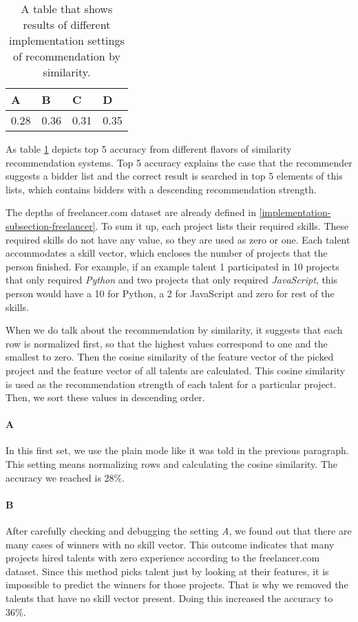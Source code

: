 \begin{table}[htp]
	\caption[Evaluation mid-results]{A table that shows results of different implementation settings of recommendation by similarity.}\label{tab:evaluation-rec-similarity}
	\centering
	\begin{tabular}{l l l l}
		\toprule
		A & B & C & D \\
		\midrule
		0.28 & 0.36 & 0.31 & 0.35 \\
		\bottomrule
	\end{tabular}
\end{table}

As table \ref{tab:evaluation-rec-similarity} depicts top 5 accuracy from different flavors of similarity recommendation systems. Top 5 accuracy explains the case that the recommender suggests a bidder list and the correct result is searched in top 5 elements of this lists, which contains bidders with a descending recommendation strength. 

The depths of freelancer.com dataset are already defined in \ref{implementation-subsection-freelancer}. To sum it up, each project lists their required skills. These required skills do not have any value, so they are used as zero or one. Each talent accommodates a skill vector, which encloses the number of projects that the person finished. For example, if an example talent 1 participated in 10 projects that only required \textit{Python} and two projects that only required \textit{JavaScript}, this person would have a 10 for Python, a 2 for JavaScript and zero for rest of the skills. 

When we do talk about the recommendation by similarity, it suggests that each row is normalized first, so that the highest values correspond to one and the smallest to zero. Then the cosine similarity of the feature vector of the picked project and the feature vector of all talents are calculated. This cosine similarity is used as the recommendation strength of each talent for a particular project. Then, we sort these values in descending order. 

\paragraph{A} In this first set, we use the plain mode like it was told in the previous paragraph. This setting means normalizing rows and calculating the cosine similarity. The accuracy we reached is 28\%. 

\paragraph{B} After carefully checking and debugging the setting \textit{A}, we found out that there are many cases of winners with no skill vector. This outcome indicates that many projects hired talents with zero experience according to the freelancer.com dataset. Since this method picks talent just by looking at their features, it is impossible to predict the winners for those projects. That is why we removed the talents that have no skill vector present. Doing this increased the accuracy to 36\%. 

